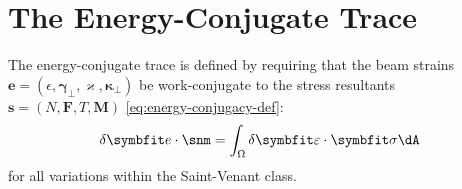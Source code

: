 \section{The Energy-Conjugate Trace}
\label{sec:trace-energy}

The energy-conjugate trace is defined by requiring that the beam strains 
$\bm{e} = (\epsilon, \bm{\gamma}_\perp, \varkappa, \bm{\kappa}_\perp)$ 
be work-conjugate to the stress resultants 
$\bm{s} = (N, \bm{F}, T, \bm{M})$ \eqref{eq:energy-conjugacy-def}:
\begin{equation*}
\delta\bm{e} \cdot \snm = \int_\Section \delta\bm{\varepsilon} \cdot \bm{\sigma} \dA
\end{equation*}
for all variations within the Saint-Venant class. 

